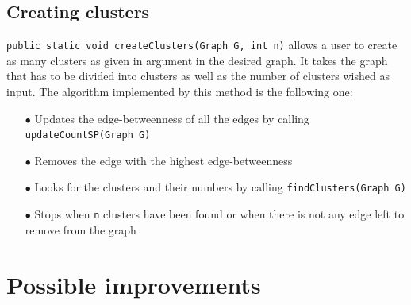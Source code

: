 \documentclass{article}
\begin{document}
\subsection{Creating clusters}

\texttt{public static void createClusters(Graph G, int n)} allows a user to create as many clusters as given in argument in the desired graph. It takes the graph that has to be divided into clusters as well as the number of clusters wished as input.
The algorithm implemented by this method is the following one:

\begin{itemize}
\item[$\bullet$] Updates the edge-betweenness of all the edges by calling \texttt{updateCountSP(Graph G)}
\item[$\bullet$] Removes the edge with the highest edge-betweenness
\item[$\bullet$] Looks for the clusters and their numbers by calling \texttt{findClusters(Graph G)}
\item[$\bullet$] Stops when \texttt{n} clusters have been found or when there is not any edge left to remove from the graph
\end{itemize}

\newpage

\section{Possible improvements}
\end{document}
